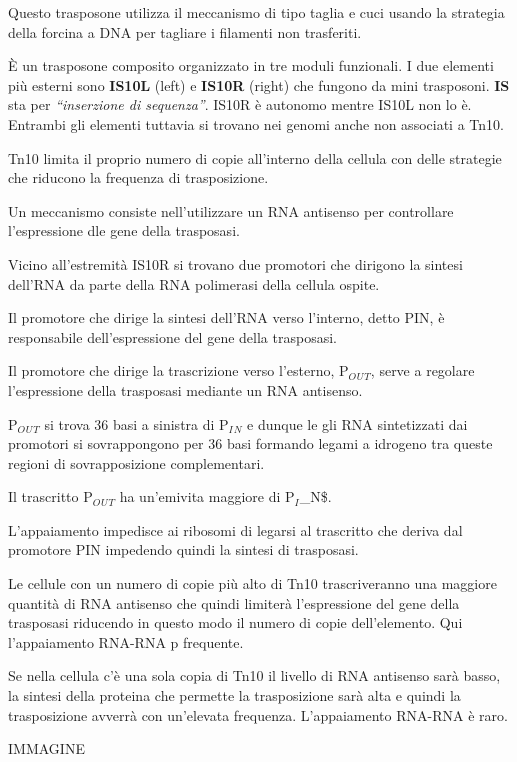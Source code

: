 \documentclass[]{article}
\begin{document}
Questo trasposone utilizza il meccanismo di tipo taglia e cuci usando la
strategia della forcina a DNA per tagliare i filamenti non trasferiti.

È un trasposone composito organizzato in tre moduli funzionali. I due
elementi più esterni sono \textbf{IS10L} (left) e \textbf{IS10R} (right)
che fungono da mini trasposoni. \textbf{IS} sta per \emph{``inserzione
di sequenza''}. IS10R è autonomo mentre IS10L non lo è. Entrambi gli
elementi tuttavia si trovano nei genomi anche non associati a Tn10.

Tn10 limita il proprio numero di copie all'interno della cellula con
delle strategie che riducono la frequenza di trasposizione.

Un meccanismo consiste nell'utilizzare un RNA antisenso per controllare
l'espressione dle gene della trasposasi.

Vicino all'estremità IS10R si trovano due promotori che dirigono la
sintesi dell'RNA da parte della RNA polimerasi della cellula ospite.

Il promotore che dirige la sintesi dell'RNA verso l'interno, detto PIN,
è responsabile dell'espressione del gene della trasposasi.

Il promotore che dirige la trascrizione verso l'esterno,
P\(_O\)\(_U\)\(_T\), serve a regolare l'espressione della trasposasi
mediante un RNA antisenso.

P\(_O\)\(_U\)\(_T\) si trova 36 basi a sinistra di P\(_I\)\(_N\) e
dunque le gli RNA sintetizzati dai promotori si sovrappongono per 36
basi formando legami a idrogeno tra queste regioni di sovrapposizione
complementari.

Il trascritto P\(_O\)\(_U\)\(_T\) ha un'emivita maggiore di
P\(_I\)\_N\$.

L'appaiamento impedisce ai ribosomi di legarsi al trascritto che deriva
dal promotore PIN impedendo quindi la sintesi di trasposasi.

Le cellule con un numero di copie più alto di Tn10 trascriveranno una
maggiore quantità di RNA antisenso che quindi limiterà l'espressione del
gene della trasposasi riducendo in questo modo il numero di copie
dell'elemento. Qui l'appaiamento RNA-RNA p frequente.

Se nella cellula c'è una sola copia di Tn10 il livello di RNA antisenso
sarà basso, la sintesi della proteina che permette la trasposizione sarà
alta e quindi la trasposizione avverrà con un'elevata frequenza.
L'appaiamento RNA-RNA è raro.

IMMAGINE
\end{document}
